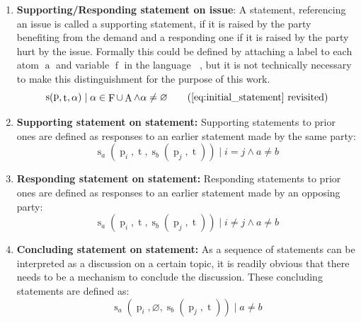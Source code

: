 \documentclass[12pt,msc,a4paper,oneside]{ucl_thesis}
\DeclareMathOperator{\Proplang}{\mathcal{L}(N)}
\DeclareMathOperator{\Propatom}{A}
\DeclareMathOperator{\propatom}{a}
\DeclareMathOperator{\Propvar}{F}
\DeclareMathOperator{\propvar}{f}
\DeclareMathOperator{\statement}{s}
\DeclareMathOperator{\statementtext}{t}
\DeclareMathOperator{\party}{p}
\begin{document}
\begin{enumerate}
    
    \item \textbf{Supporting/Responding statement on issue}: A statement, referencing an issue is called a supporting statement, if it is raised by the party benefiting from the demand and a responding one if it is raised by the party hurt by the issue. Formally this could be defined by attaching a label to each atom $\propatom$ and variable $\propvar$ in the language $\Proplang$, but it is not technically necessary to make this distinguishment for the purpose of this work.
        \begin{equation*}
            \statement(\party, \statementtext, \alpha) \mid \alpha \in \Propvar \cup \Propatom \wedge \alpha \neq \varnothing
            \tag{\ref{eq:initial_statement} revisited}
        \end{equation*}

    \item \textbf{Supporting statement on statement:} Supporting statements to prior ones are defined as responses to an earlier statement made by the same party: 
        \begin{equation}
            \statement_a(\party_i, \statementtext, \statement_b(\party_j, \statementtext)) \mid i = j \wedge a \neq b
        \end{equation}
   
    \item \textbf{Responding statement on statement:} Responding statements to prior ones are defined as responses to an earlier statement made by an opposing party:
        \begin{equation}
            \statement_a(\party_i, \statementtext, \statement_b(\party_j, \statementtext)) \mid i \neq j \wedge a \neq b
        \end{equation}
    
    \item \textbf{Concluding statement on statement:} As a sequence of statements can be interpreted as a discussion on a certain topic, it is readily obvious that there needs to be a mechanism to conclude the discussion. These concluding statements are defined as:
        \begin{equation}
            \statement_a(\party_i, \varnothing, \statement_b(\party_j, \statementtext)) \mid a \neq b
        \end{equation}
\end{enumerate}
\end{document}
